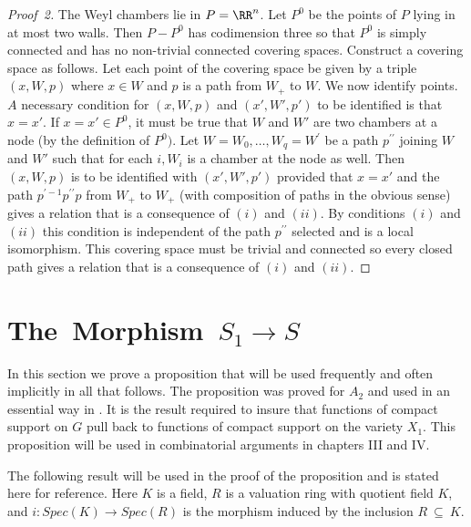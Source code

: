\documentclass{memo-l}
\theoremstyle{definition}
\theoremstyle{remark}
\numberwithin{section}{chapter}
\numberwithin{equation}{chapter}
\begin{document}
\begin{proof}[Proof\ 2] The Weyl chambers lie in $P={\RR}^{n}$.  Let
  $P^{0}$ be the points of $P$ lying in at most two walls.  Then
  $P-P^{0}$ has codimension three so that $P^{0}$ is simply connected
  and has no non-trivial connected covering spaces.  Construct a
  covering space as follows.  Let each point of the covering space be
  given by a triple $(x,W,p)$ where $x \in W$ and $p$ is a path from
  $W_{+}$ to $W$.  We now identify points.  $A$ necessary condition
  for $(x,W,p)$ and $(x',W',p')$ to be identified is that $x=x'$.  If
  $x=x' \in P^{0}$, it must be true that $W$ and $W'$ are two chambers
  at a node (by the definition of $P^{0})$.  Let $W=W_{0},\ldots
  ,W_{q}=W^{'}$ be a path $p^{\prime\prime}$ joining $W$ and $W'$ such
  that for each $i, W_{i}$ is a chamber at the node as well.  Then
  $(x,W,p)$ is to be identified with $(x',W',p')$ provided that $x=x'$
  and the path $p^{\prime-1}p^{\prime\prime}p$ from $W_{+}$ to $W_{+}$
  (with composition of paths in the obvious sense) gives a relation
  that is a consequence of $(i)$ and $(ii)$.  By conditions $(i)$ and
  $(ii)$ this condition is independent of the path $p^{\prime\prime}$
  selected and is a local isomorphism.  This covering space must be
  trivial and connected so every closed path gives a relation that is
  a consequence of $(i)$ and $(ii)$.
\end{proof}

\section{{The\ Morphism\ $S_1 \to S$}}

In this section we prove a proposition that will be used frequently
and often implicitly in all that follows.  The proposition was proved
for $A_{2}$ and used in an essential way in \cite{MR701566}.  It is the
result required to insure that functions of compact support on $G$
pull back to functions of compact support on the variety $X_{1}$.
This proposition will be used in combinatorial arguments in chapters
III and IV.

The following result will be used in the proof of the proposition and
is stated here for reference.  Here $K$ is a field, $R$ is a valuation
ring with quotient field $K$, and $i:Spec(K) {\to} Spec(R)$ is the
morphism induced by the inclusion $R\ {\subseteq}\ K$.
\end{document}
